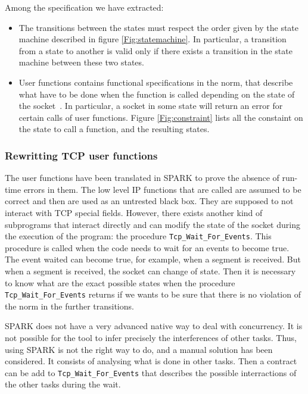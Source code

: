 \documentclass[runningheads]{llncs}
\begin{document}
    Among the specification we have extracted:
    \begin{itemize}
        \item The transitions between the states must respect the order given by the state machine described
              in figure \ref{Fig:statemachine}.
              In particular, a transition from a state to another is valid only if there exists a transition in the state machine
              between these two states.
        \item User functions contains functional specifications in the norm, that describe what have to be done when the function
              is called depending on the state of the socket~\cite[p.~52]{rfc793}.
              In particular, a socket in some state will return an error for certain calls of user functions. Figure \ref{Fig:constraint}
              lists all the constaint on the state to call a function, and the resulting states.
    \end{itemize}

\subsubsection{Rewritting TCP user functions}

    The user functions have been translated in SPARK to prove the absence of run-time errors in them. The low level IP functions
    that are called are assumed to be correct and then are used as an untrested black box. They are supposed to not interact with TCP
    special fields. However, there exists another kind of subprograms that interact directly and can modify the state of the socket
    during the execution of the program: the procedure \lstinline{Tcp_Wait_For_Events}. This procedure is called when the code needs
    to wait for an events to become true. The event waited can become true, for example, when a segment is received. But when a
    segment is received, the socket can change of state. Then it is necessary to know what are the exact possible states when the
    procedure \lstinline{Tcp_Wait_For_Events} returns if we wants to be sure that there is no violation of the norm in the further transitions.

    SPARK does not have a very advanced native way to deal with concurrency. It is not possible for the tool to infer precisely the
    interferences of other tasks. Thus, using SPARK is not the right way to do, and a manual solution has been considered. It consists
    of analysing what is done in other tasks. Then a contract can be add to \lstinline{Tcp_Wait_For_Events} that describes the possible
    interractions of the other tasks during the wait.
\end{document}
